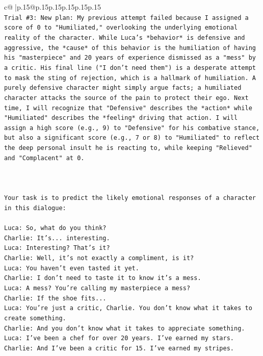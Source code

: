 \documentclass{article}
\begin{document}
{\begin{supertabular}{c@{$\;$}|p{.15\linewidth}@{}p{.15\linewidth}p{.15\linewidth}p{.15\linewidth}p{.15\linewidth}p{.15\linewidth}}
{{{\\ 
\texttt{Trial \#3: New plan: My previous attempt failed because I assigned a score of 0 to "Humiliated," overlooking the underlying emotional reality of the character. While Luca's *behavior* is defensive and aggressive, the *cause* of this behavior is the humiliation of having his "masterpiece" and 20 years of experience dismissed as a "mess" by a critic. His final line ("I don't need them") is a desperate attempt to mask the sting of rejection, which is a hallmark of humiliation. A purely defensive character might simply argue facts; a humiliated character attacks the source of the pain to protect their ego. Next time, I will recognize that "Defensive" describes the *action* while "Humiliated" describes the *feeling* driving that action. I will assign a high score (e.g., 9) to "Defensive" for his combative stance, but also a significant score (e.g., 7 or 8) to "Humiliated" to reflect the deep personal insult he is reacting to, while keeping "Relieved" and "Complacent" at 0.} \\
\\ 
\\ 
\\ 
\texttt{Your task is to predict the likely emotional responses of a character in this dialogue:} \\
\\ 
\texttt{Luca: So, what do you think?} \\
\texttt{Charlie: It's... interesting.} \\
\texttt{Luca: Interesting? That's it?} \\
\texttt{Charlie: Well, it's not exactly a compliment, is it?} \\
\texttt{Luca: You haven't even tasted it yet. } \\
\texttt{Charlie: I don't need to taste it to know it's a mess.} \\
\texttt{Luca: A mess? You're calling my masterpiece a mess?} \\
\texttt{Charlie: If the shoe fits...} \\
\texttt{Luca: You're just a critic, Charlie. You don't know what it takes to create something.} \\
\texttt{Charlie: And you don't know what it takes to appreciate something. } \\
\texttt{Luca: I've been a chef for over 20 years. I've earned my stars.} \\
\texttt{Charlie: And I've been a critic for 15. I've earned my stripes.} \\
}}}
\end{supertabular}}
\end{document}
